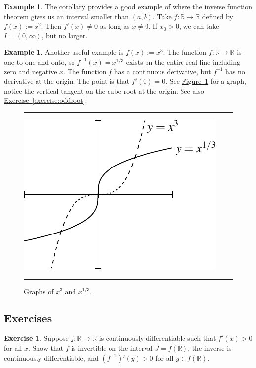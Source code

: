 \documentclass[12pt]{book}
\newenvironment{myfigureht}{%
\begin{figure}[h!t]
\noindent\rule{\textwidth}{0.4pt}\vspace{12pt}\par\centering}%
{\par\noindent\rule{\textwidth}{0.4pt}
\end{figure}}
\newcommand{\R}{{\mathbb{R}}}
\theoremstyle{plain}
\theoremstyle{remark}
\theoremstyle{definition}
\theoremstyle{exercise}
\newtheorem{exercise}{Exercise}[section]
\theoremstyle{example}
\newtheorem{example}[thm]{Example}
\newcommand{\figureref}[1]{\hyperref[#1]{Figure~\ref*{#1}}}
\newcommand{\exerciseref}[1]{\hyperref[#1]{Exercise~\ref*{#1}}}
\begin{document}
\begin{example}
The corollary provides a good example of where the inverse function theorem
gives us an interval smaller than $(a,b)$.  Take $f \colon \R \to \R$
defined by $f(x) := x^2$.  Then $f'(x) \not= 0$
as long as $x \not= 0$.  If $x_0 > 0$, we can take $I=(0,\infty)$, but
no larger.
\end{example}

\begin{example}
Another useful example is $f(x) := x^3$.  The function $f \colon \R \to \R$ is
one-to-one and onto, so $f^{-1}(x) = x^{1/3}$ exists on the entire real
line including zero and negative $x$.  The function $f$ has
a continuous derivative, but $f^{-1}$ has no derivative at the origin.  The
point is that $f'(0) = 0$.  See \figureref{cubecuberootfig} for a graph,
notice the vertical tangent on the cube root at the origin.
See also \exerciseref{exercise:oddroot}.
\begin{myfigureht}
\includegraphics{figures/cubecuberoot}
\caption{Graphs of $x^3$ and $x^{1/3}$.\label{cubecuberootfig}}
\end{myfigureht}
\end{example}


\subsection{Exercises}

\begin{exercise}
Suppose $f \colon \R \to \R$ is continuously differentiable such that
$f'(x) > 0$ for all $x$.  Show that $f$ is invertible on the interval $J =
f(\R)$, the inverse is continuously differentiable, and ${(f^{-1})}'(y) >
0$ for all $y \in f(\R)$.
\end{exercise}
\end{document}
